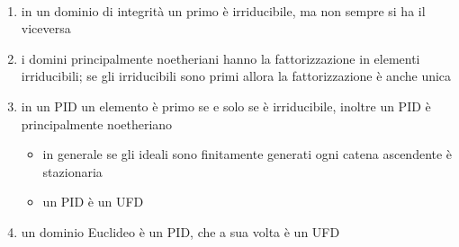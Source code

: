 \begin{osservazione}
	\
	\begin{enumerate}
		\item in un dominio di integrità un primo è irriducibile, ma non sempre si ha il viceversa
		\item i domini principalmente noetheriani hanno la fattorizzazione in elementi irriducibili; se gli irriducibili sono primi allora la fattorizzazione è anche unica
		\item in un PID un elemento è primo se e solo se è irriducibile, inoltre un PID è principalmente noetheriano 
		\begin{itemize}
			\item in generale se gli ideali sono finitamente generati ogni catena ascendente è stazionaria
			\item un PID è un UFD
		\end{itemize}
	\item un dominio Euclideo è un PID, che a sua volta è un UFD
	\end{enumerate}
\end{osservazione}




